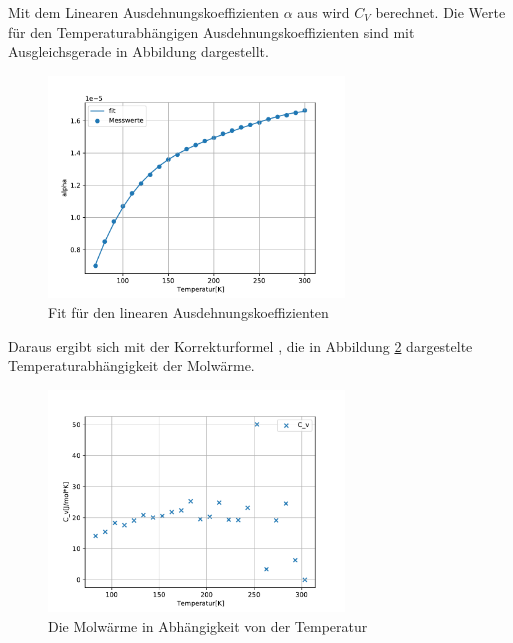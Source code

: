 Mit dem Linearen Ausdehnungskoeffizienten $\alpha$ aus \cite*{sample} wird $C_V$ berechnet.
Die Werte für den Temperaturabhängigen Ausdehnungskoeffizienten sind mit Ausgleichsgerade in Abbildung  dargestellt.
\begin{figure}[h] 
  \centering
     \includegraphics[width=0.7\textwidth]{Auswertung/Plots/alpha.pdf}
  \caption{Fit für den linearen Ausdehnungskoeffizienten}
  \label{fig:alpha}
\end{figure}
Daraus ergibt sich mit der Korrekturformel , die in Abbildung \ref{fig:C_v} dargestelte Temperaturabhängigkeit der Molwärme.
\begin{figure}[h] 
    \centering
       \includegraphics[width=0.7\textwidth]{Auswertung/Plots/C_v.pdf}
    \caption{Die Molwärme in Abhängigkeit von der Temperatur}
    \label{fig:C_v}
\end{figure}




